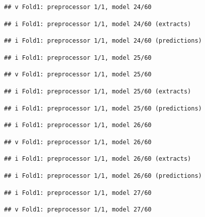 \documentclass[
]{article}
\begin{document}
\begin{verbatim}
## v Fold1: preprocessor 1/1, model 24/60
\end{verbatim}

\begin{verbatim}
## i Fold1: preprocessor 1/1, model 24/60 (extracts)
\end{verbatim}

\begin{verbatim}
## i Fold1: preprocessor 1/1, model 24/60 (predictions)
\end{verbatim}

\begin{verbatim}
## i Fold1: preprocessor 1/1, model 25/60
\end{verbatim}

\begin{verbatim}
## v Fold1: preprocessor 1/1, model 25/60
\end{verbatim}

\begin{verbatim}
## i Fold1: preprocessor 1/1, model 25/60 (extracts)
\end{verbatim}

\begin{verbatim}
## i Fold1: preprocessor 1/1, model 25/60 (predictions)
\end{verbatim}

\begin{verbatim}
## i Fold1: preprocessor 1/1, model 26/60
\end{verbatim}

\begin{verbatim}
## v Fold1: preprocessor 1/1, model 26/60
\end{verbatim}

\begin{verbatim}
## i Fold1: preprocessor 1/1, model 26/60 (extracts)
\end{verbatim}

\begin{verbatim}
## i Fold1: preprocessor 1/1, model 26/60 (predictions)
\end{verbatim}

\begin{verbatim}
## i Fold1: preprocessor 1/1, model 27/60
\end{verbatim}

\begin{verbatim}
## v Fold1: preprocessor 1/1, model 27/60
\end{verbatim}
\end{document}
